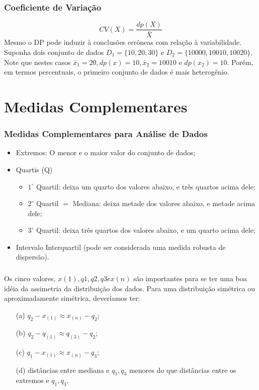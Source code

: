 \documentclass[14pt,aspectratio=1610]{beamer}
\begin{document}
\begin{frame}{}
\frametitle{Coeficiente de Variação}
\begin{block}{}
\justifying
\begin{equation}
CV(X)=\dfrac{dp(X)}{\bar{X}}
\end{equation}
Mesmo o DP pode induzir à conclusões errôneas com relação à variabilidade. Suponha dois conjunto de dados 
$D_{1}=\{10,20,30\}$ e $D_{2}=\{10000,10010,10020\}.$ Note que nestes casos $\bar{x}_{1}=20, dp(x)=10, 
\bar{x}_{2}=10010$ e $dp(x_{2})=10.$ Porém, em termos percentuais, o primeiro conjunto de dados é mais 
heterogênio.
\end{block}
\end{frame}

\section{Medidas Complementares}
\begin{frame}{}
\frametitle{Medidas Complementares para Análise de Dados}
\begin{block}{}
\justifying
\begin{itemize}
\item Extremos: O menor e o maior valor do conjunto de dados;
\item Quartis (Q)
\begin{itemize}
\item $1^{\circ}$ Quartil: deixa um quarto dos valores abaixo, e três quartos acima dele;
\item $2^{\circ}$ Quartil $=$ Mediana: deixa metade dos valores abaixo, e metade acima dele;
\item $3^{\circ}$ Quartil: deixa três quartos dos valores abaixo, e um quarto acima dele;
\end{itemize}
\item Intervalo Interquartil (pode ser considerada uma medida robusta de dispersão).
\end{itemize}

\end{block}
\end{frame}

\begin{frame}{}
\frametitle{}
\begin{block}{}
\justifying
Os cinco valores, $x(1), q1, q2, q3 e x(n)$ são importantes para se ter uma boa idéia da
assimetria da distribuição dos dados. Para uma distribuição simétrica ou aproximadamente
simétrica, deveríamos ter:
\begin{enumerate}
\item[(a)] $q_{2}-x_{(1)}\approx x_{(n)}-q_{2};$
\item[(b)] $q_{2}-q_{(1)}\approx q_{(3)}-q_{2};$
\item[(c)] $q_{1}-x_{(1)}\approx x_{(n)}-q_{3};$
\item[(d)] distâncias entre mediana e $q_{1}, q_{3}$ menores do que distâncias entre os extremos e $q_{1}, q_{3}.$
\end{enumerate}
\end{block}
\end{frame}
\end{document}
